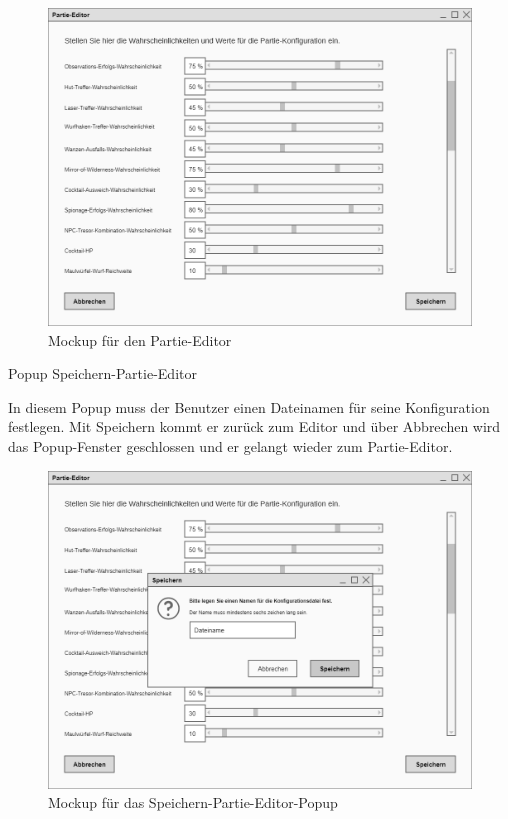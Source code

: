 \begin{figure}
  \centering
  \includegraphics[width=\textwidth]{Meilenstein03/Partie-Editor_Mockup.png}
  \caption{Mockup für den Partie-Editor}
\end{figure}

Popup \glqq{}Speichern-Partie-Editor\grqq{}

In diesem Popup muss der Benutzer einen Dateinamen für seine Konfiguration festlegen. Mit Speichern kommt er zurück zum Editor und über Abbrechen wird das Popup-Fenster geschlossen und er gelangt wieder zum Partie-Editor.

\begin{figure}
  \centering
  \includegraphics[width=\textwidth]{Meilenstein03/Speichern-Partie-Editor_Mockup.png}
  \caption{Mockup für das Speichern-Partie-Editor-Popup}
\end{figure}

